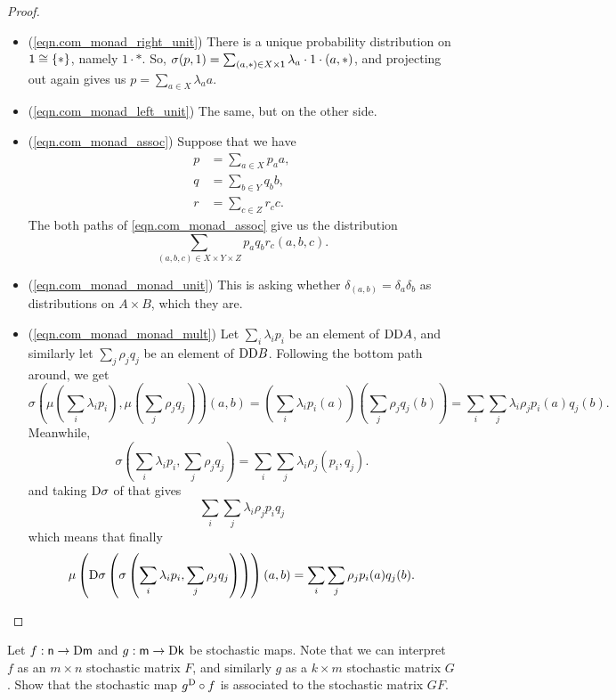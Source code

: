 \documentclass[DynamicalBook]{subfiles}
\begin{document}
\begin{proof}
  \begin{itemize}
\item (\cref{eqn.com_monad_right_unit}) There is a unique probability distribution on $\mathsf{1} \cong \{\ast\}$,
  namely $1 \cdot \ast$. So, $\sigma(p, 1) = \sum_{(a, \ast) \in X \times
    \mathsf{1}} \lambda_a \cdot 1 \cdot (a, \ast)$, and projecting out again gives
  us $p = \sum_{a \in X} \lambda_a a$.
\item (\cref{eqn.com_monad_left_unit}) The same, but on the other side.
\item (\cref{eqn.com_monad_assoc}) Suppose that we have
  \begin{align*}
    p &= \sum_{a \in X} p_a a, \\
    q &= \sum_{b \in Y} q_b b, \\
    r &= \sum_{c \in Z} r_c c.
  \end{align*}
  The both paths of \cref{eqn.com_monad_assoc} give us the distribution
  \[
\sum_{(a, b, c) \in X \times Y \times Z} p_a q_b r_c (a, b, c).
  \]
  \item (\cref{eqn.com_monad_monad_unit}) This is asking whether $\delta_{(a,
      b)} = \delta_a \delta_b$ as distributions on $A \times B$, which they are.
  \item (\cref{eqn.com_monad_monad_mult}) Let $\sum_{i} \lambda_i p_i$ be an
    element of $\mathrm{D}\mathrm{D} A$, and similarly let $\sum_j \rho_j q_j$ be an
    element of $\mathrm{D}\mathrm{D} B$. Following the bottom path around, we get
    \[
\sigma\left( \mu\left( \sum_i \lambda_i p_i \right), \mu\left( \sum_j \rho_j q_j
  \right) \right)(a, b) = \left( \sum_i \lambda_i p_i(a) \right)\left( \sum_j
  \rho_j q_j(b) \right) = \sum_i \sum_j \lambda_i \rho_j p_i(a)q_j(b).
    \]
    Meanwhile,
    \[\sigma\left( \sum_i \lambda_i p_i, \sum_j \rho_j q_j \right) =
      \sum_i \sum_j \lambda_i \rho_j (p_i, q_j).
    \]
    and taking $\mathrm{D} \sigma$ of that gives
    \[
\sum_i \sum_j \lambda_i \rho_j p_i q_j
\]
which means that finally
\[
\mu\left(\mathrm{D} \sigma\left( \sigma\left( \sum_i \lambda_i p_i, \sum_j \rho_j
      q_j \right) \right) \right)(a, b) = \sum_i \sum_j \rho_j p_i(a)q_j(b).
\]
  \end{itemize}

\end{proof}

\begin{exercise}
  Let $f : \mathsf{n} \to \mathrm{D} \mathsf{m}$ and $g : \mathsf{m} \to \mathrm{D} \mathsf{k}$
  be stochastic maps. Note that we can interpret $f$ as an $m \times n$
  stochastic matrix $F$, and similarly $g$ as a $k \times m$ stochastic matrix $G$. Show
  that the stochastic map $g^{\mathrm{D}} \circ f$ is associated to the stochastic
  matrix $GF$.
\end{exercise}
\end{document}
